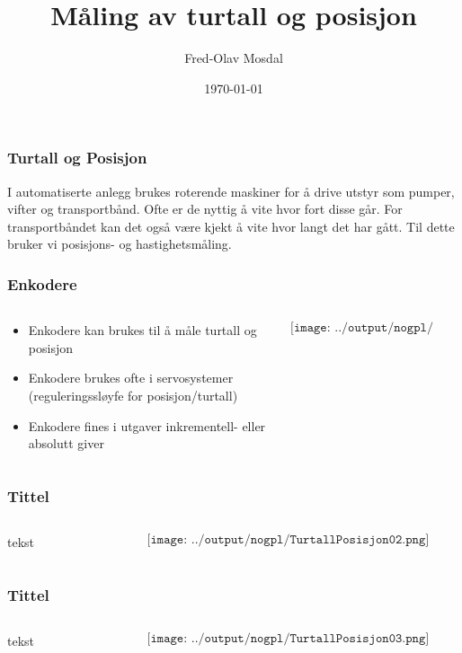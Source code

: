 \documentclass[aspectratio=169,xcolor=dvipsnames]{beamer}
\title[posisjon]{Måling av turtall og posisjon} %
\author[Fred-Olav] {Fred-Olav Mosdal}
\institute[Gand VGS] %
{
    Gand VGS \\
    VG3 Automasjon }
\date{\today} %
\begin{document}
\begin{frame}
	\frametitle{Turtall og Posisjon}
	I automatiserte anlegg brukes roterende maskiner for å drive utstyr som pumper, vifter og transportbånd. 
	\vskip 0.5cm
	Ofte er de nyttig å vite hvor fort disse går. For transportbåndet kan det også være kjekt å vite hvor langt det har gått. 
	Til dette bruker vi posisjons- og hastighetsmåling. 
\end{frame}


\begin{frame}
	\frametitle{Enkodere}
	\begin{columns}
		\begin{column}{0.5\textwidth}
		\begin{itemize}
			\item Enkodere kan brukes til å måle turtall og posisjon
			\item Enkodere brukes ofte i servosystemer (reguleringssløyfe for posisjon/turtall)
				\item Enkodere fines i utgaver inkrementell- eller absolutt giver
		\end{itemize}	
		\end{column}

		\begin{column}{0.5\textwidth}
	$$\texttt{[image: ../output/nogpl/TurtallPosisjon01.png]}$$
		\end{column}
	\end{columns}
\end{frame}

\begin{frame}
	\frametitle{Tittel}
	\begin{columns}
		\begin{column}{0.5\textwidth}
tekst
			
		\end{column}

		\begin{column}{0.5\textwidth}
	$$\texttt{[image: ../output/nogpl/TurtallPosisjon02.png]}$$
		\end{column}
	\end{columns}
\end{frame}

\begin{frame}
	\frametitle{Tittel}
	\begin{columns}
		\begin{column}{0.5\textwidth}
tekst
			
		\end{column}

		\begin{column}{0.5\textwidth}
	$$\texttt{[image: ../output/nogpl/TurtallPosisjon03.png]}$$
		\end{column}
	\end{columns}
\end{frame}
\end{document}
